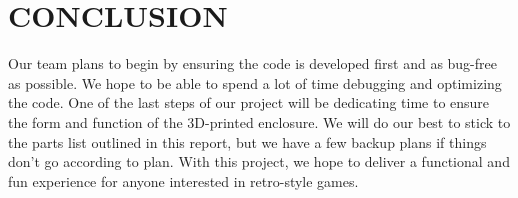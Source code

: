 \documentclass[12pt]{article}
\begin{document}
\newpage
\section{CONCLUSION}
Our team plans to begin by ensuring the code is developed first and as bug-free as possible. We hope to be able to spend a lot of time debugging and optimizing the code. One of the last steps of our project will be dedicating time to ensure the form and function of the 3D-printed enclosure. We will do our best to stick to the parts list outlined in this report, but we have a few backup plans if things don't go according to plan. With this project, we hope to deliver a functional and fun experience for anyone interested in retro-style games. 


\newpage
\printbibliography[heading=subbibintoc]
%
%
\end{document}
